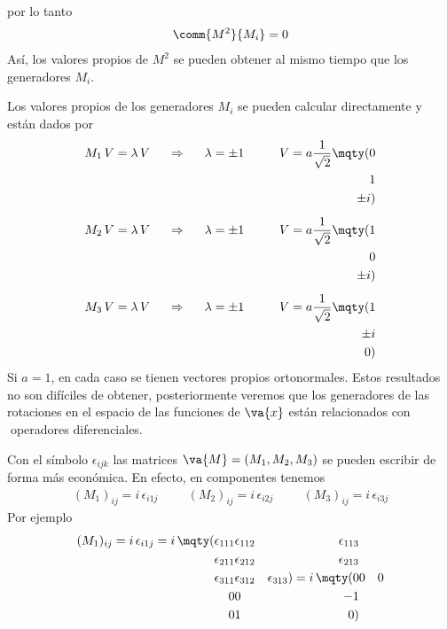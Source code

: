 por lo tanto
\begin{align}
\comm{M^{2}}{M_{i}} = 0
\label{eq:ecuacion_10_086}
\end{align}
Así, los valores propios de $M^{2}$ se pueden obtener al mismo tiempo que los generadores $M_{i}$.
\par
Los valores propios de los generadores $M_{i}$ se pueden calcular directamente y están dados por
\begin{align}
M_{1} \, V = \lambda \, V \hspace{0.5cm} \Rightarrow \hspace{0.5cm} \lambda = \pm 1 \hspace{1cm} V = a \dfrac{1}{\sqrt{2}} \mqty(0 \\ 1 \\ \pm i) \label{eq:ecuacion_10_087} \\[0.5em]
M_{2} \, V = \lambda \, V \hspace{0.5cm} \Rightarrow \hspace{0.5cm} \lambda = \pm 1 \hspace{1cm} V = a \dfrac{1}{\sqrt{2}} \mqty(1 \\ 0 \\ \pm i) \label{eq:ecuacion_10_088} \\[0.5em]
M_{3} \, V = \lambda \, V \hspace{0.5cm} \Rightarrow \hspace{0.5cm} \lambda = \pm 1 \hspace{1cm} V = a \dfrac{1}{\sqrt{2}} \mqty(1 \\ \pm i \\ 0) \label{eq:ecuacion_10_089}
\end{align}
Si $a = 1$, en cada caso se tienen vectores propios ortonormales. Estos resultados no son difíciles de obtener, posteriormente veremos que los generadores de las rotaciones en el espacio de las funciones de $\va{x}$ están relacionados con operadores diferenciales.
\par
Con el símbolo $\epsilon_{ijk}$ las matrices $\va{M} = (M_{1}, M_{2}, M_{3})$ se pueden escribir de forma más económica. En efecto, en componentes tenemos
\begin{align}
(M_{1})_{ij} = i \, \epsilon_{i 1 j} \hspace{1cm} (M_{2})_{ij} = i \, \epsilon_{i 2 j} \hspace{1cm} (M_{3})_{ij} = i \, \epsilon_{i 3 j} \label{eq:ecuacion_10_090}
\end{align}
Por ejemplo
\begin{align}
(M_{1})_{ij} = i \, \epsilon_{i 1 j} = i \, \mqty(\epsilon_{111} & \epsilon_{112} & \epsilon_{113} \\ \epsilon_{211} & \epsilon_{212} & \epsilon_{213} \\ \epsilon_{311} & \epsilon_{312} & \epsilon_{313}) = i \, \mqty(0 & 0 & 0 \\ 0 & 0 & -1 \\ 0 & 1 & 0)
\label{eq:ecuacion_10_091}
\end{align}
